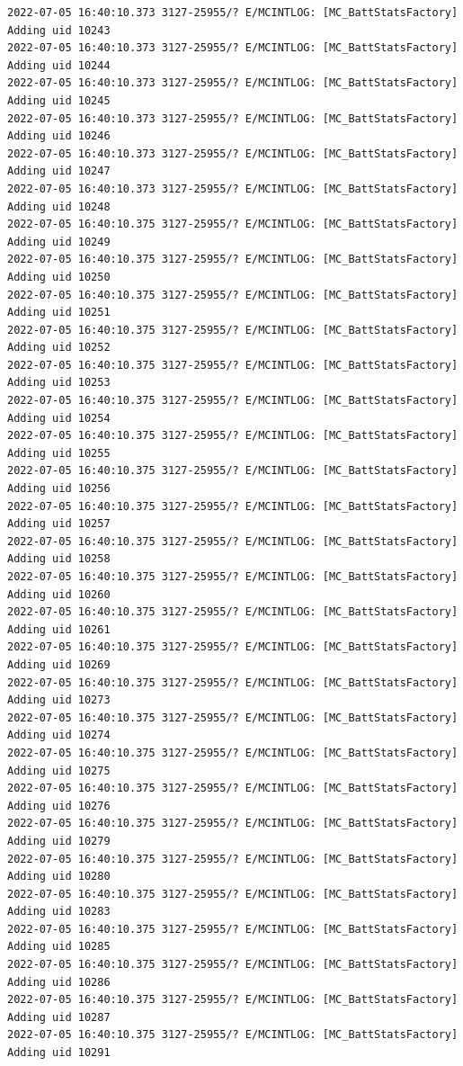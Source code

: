 \documentclass[a4paper,12pt]{book}
\begin{document}
\begin{lstlisting}
2022-07-05 16:40:10.373 3127-25955/? E/MCINTLOG: [MC_BattStatsFactory] Adding uid 10243
2022-07-05 16:40:10.373 3127-25955/? E/MCINTLOG: [MC_BattStatsFactory] Adding uid 10244
2022-07-05 16:40:10.373 3127-25955/? E/MCINTLOG: [MC_BattStatsFactory] Adding uid 10245
2022-07-05 16:40:10.373 3127-25955/? E/MCINTLOG: [MC_BattStatsFactory] Adding uid 10246
2022-07-05 16:40:10.373 3127-25955/? E/MCINTLOG: [MC_BattStatsFactory] Adding uid 10247
2022-07-05 16:40:10.373 3127-25955/? E/MCINTLOG: [MC_BattStatsFactory] Adding uid 10248
2022-07-05 16:40:10.375 3127-25955/? E/MCINTLOG: [MC_BattStatsFactory] Adding uid 10249
2022-07-05 16:40:10.375 3127-25955/? E/MCINTLOG: [MC_BattStatsFactory] Adding uid 10250
2022-07-05 16:40:10.375 3127-25955/? E/MCINTLOG: [MC_BattStatsFactory] Adding uid 10251
2022-07-05 16:40:10.375 3127-25955/? E/MCINTLOG: [MC_BattStatsFactory] Adding uid 10252
2022-07-05 16:40:10.375 3127-25955/? E/MCINTLOG: [MC_BattStatsFactory] Adding uid 10253
2022-07-05 16:40:10.375 3127-25955/? E/MCINTLOG: [MC_BattStatsFactory] Adding uid 10254
2022-07-05 16:40:10.375 3127-25955/? E/MCINTLOG: [MC_BattStatsFactory] Adding uid 10255
2022-07-05 16:40:10.375 3127-25955/? E/MCINTLOG: [MC_BattStatsFactory] Adding uid 10256
2022-07-05 16:40:10.375 3127-25955/? E/MCINTLOG: [MC_BattStatsFactory] Adding uid 10257
2022-07-05 16:40:10.375 3127-25955/? E/MCINTLOG: [MC_BattStatsFactory] Adding uid 10258
2022-07-05 16:40:10.375 3127-25955/? E/MCINTLOG: [MC_BattStatsFactory] Adding uid 10260
2022-07-05 16:40:10.375 3127-25955/? E/MCINTLOG: [MC_BattStatsFactory] Adding uid 10261
2022-07-05 16:40:10.375 3127-25955/? E/MCINTLOG: [MC_BattStatsFactory] Adding uid 10269
2022-07-05 16:40:10.375 3127-25955/? E/MCINTLOG: [MC_BattStatsFactory] Adding uid 10273
2022-07-05 16:40:10.375 3127-25955/? E/MCINTLOG: [MC_BattStatsFactory] Adding uid 10274
2022-07-05 16:40:10.375 3127-25955/? E/MCINTLOG: [MC_BattStatsFactory] Adding uid 10275
2022-07-05 16:40:10.375 3127-25955/? E/MCINTLOG: [MC_BattStatsFactory] Adding uid 10276
2022-07-05 16:40:10.375 3127-25955/? E/MCINTLOG: [MC_BattStatsFactory] Adding uid 10279
2022-07-05 16:40:10.375 3127-25955/? E/MCINTLOG: [MC_BattStatsFactory] Adding uid 10280
2022-07-05 16:40:10.375 3127-25955/? E/MCINTLOG: [MC_BattStatsFactory] Adding uid 10283
2022-07-05 16:40:10.375 3127-25955/? E/MCINTLOG: [MC_BattStatsFactory] Adding uid 10285
2022-07-05 16:40:10.375 3127-25955/? E/MCINTLOG: [MC_BattStatsFactory] Adding uid 10286
2022-07-05 16:40:10.375 3127-25955/? E/MCINTLOG: [MC_BattStatsFactory] Adding uid 10287
2022-07-05 16:40:10.375 3127-25955/? E/MCINTLOG: [MC_BattStatsFactory] Adding uid 10291

\end{lstlisting}
\end{document}
